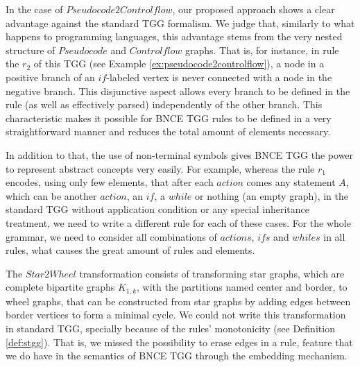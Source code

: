 \documentclass[]{report}
\begin{document}
In the case of $Pseudocode2Controlflow$, our proposed approach shows a clear advantage against the standard TGG formalism. We judge that, similarly to what happens to programming languages, this advantage stems from the very nested structure of $Pseudocode$ and $Controlflow$ graphs. That is, for instance, in rule the $r_2$ of this TGG (see Example \ref{ex:pseudocode2controlflow}), a node in a positive branch of an $if$-labeled vertex is never connected with a node in the negative branch. This disjunctive aspect allows every branch to be defined in the rule (as well as effectively parsed) independently of the other branch. This characteristic makes it possible for BNCE TGG rules to be defined in a very straightforward manner and reduces the total amount of elements necessary.

In addition to that, the use of non-terminal symbols gives BNCE TGG the power to represent abstract concepts very easily. For example, whereas the rule $r_1$ encodes, using only few elements, that after each $action$ comes any statement $A$, which can be another $action$, an $if$, a $while$ or nothing (an empty graph), in the standard TGG without application condition or any special inheritance treatment, we need to write a different rule for each of these cases. For the whole grammar, we need to consider all combinations of $actions$, $ifs$ and $whiles$ in all rules, what causes the great amount of rules and elements.

The $Star2Wheel$ transformation consists of transforming star graphs, which are complete bipartite graphs $K_{1,k}$, with the partitions named center and border, to wheel graphs, that can be constructed from star graphs by adding edges between border vertices to form a minimal cycle. We could not write this transformation in standard TGG, specially because of the rules' monotonicity (see Definition \ref{def:stgg}). That is, we missed the possibility to erase edges in a rule, feature that we do have in the semantics of BNCE TGG through the embedding mechanism.



\end{document}

